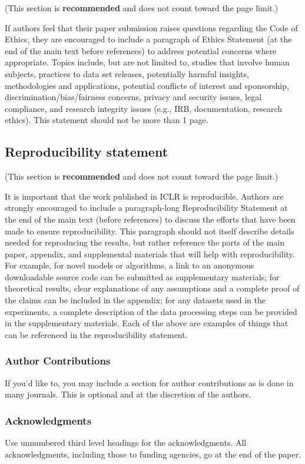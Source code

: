 \documentclass{article} %
\begin{document}
(This section is \textbf{recommended} and does not count toward the page limit.)

If authors feel that their paper submission raises questions regarding the Code
of Ethics, they are encouraged to include a paragraph of Ethics Statement (at
the end of the main text before references) to address potential concerns where
appropriate. Topics include, but are not limited to, studies that involve human
subjects, practices to data set releases, potentially harmful insights,
methodologies and applications, potential conflicts of interest and sponsorship,
discrimination/bias/fairness concerns, privacy and security issues, legal
compliance, and research integrity issues (e.g., IRB, documentation, research
ethics). This statement should not be more than 1 page.

\subsection*{Reproducibility statement}

(This section is \textbf{recommended} and does not count toward the page limit.)

It is important that the work published in ICLR is reproducible. Authors are
strongly encouraged to include a paragraph-long Reproducibility Statement at the
end of the main text (before references) to discuss the efforts that have been
made to ensure reproducibility. This paragraph should not itself describe
details needed for reproducing the results, but rather reference the parts of
the main paper, appendix, and supplemental materials that will help with
reproducibility. For example, for novel models or algorithms, a link to an
anonymous downloadable source code can be submitted as supplementary materials;
for theoretical results, clear explanations of any assumptions and a complete
proof of the claims can be included in the appendix; for any datasets used in
the experiments, a complete description of the data processing steps can be
provided in the supplementary materials. Each of the above are examples of
things that can be referenced in the reproducibility statement.

\subsubsection*{Author Contributions}
If you'd like to, you may include  a section for author contributions as is done
in many journals. This is optional and at the discretion of the authors.

\subsubsection*{Acknowledgments}
Use unnumbered third level headings for the acknowledgments. All
acknowledgments, including those to funding agencies, go at the end of the paper.





\appendix

\end{document}
